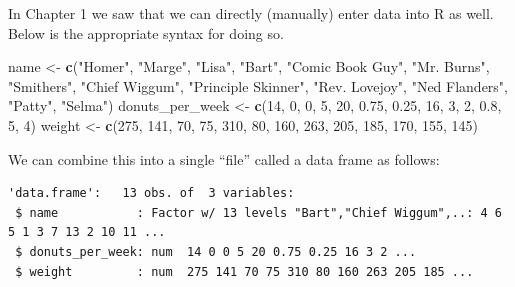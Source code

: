 \documentclass[]{book}
\newenvironment{Shaded}{\begin{snugshade}}{\end{snugshade}}
\newcommand{\DecValTok}[1]{\textcolor[rgb]{0.00,0.00,0.81}{#1}}
\newcommand{\FloatTok}[1]{\textcolor[rgb]{0.00,0.00,0.81}{#1}}
\newcommand{\KeywordTok}[1]{\textcolor[rgb]{0.13,0.29,0.53}{\textbf{#1}}}
\newcommand{\NormalTok}[1]{#1}
\newcommand{\OperatorTok}[1]{\textcolor[rgb]{0.81,0.36,0.00}{\textbf{#1}}}
\newcommand{\StringTok}[1]{\textcolor[rgb]{0.31,0.60,0.02}{#1}}
\begin{document}
In Chapter 1 we saw that we can directly (manually) enter data into R as well. Below is the appropriate syntax for doing so.

\begin{Shaded}
\begin{Highlighting}[]
\NormalTok{name <-}\StringTok{ }\KeywordTok{c}\NormalTok{(}\StringTok{"Homer"}\NormalTok{, }\StringTok{"Marge"}\NormalTok{, }\StringTok{"Lisa"}\NormalTok{, }\StringTok{"Bart"}\NormalTok{, }\StringTok{"Comic Book Guy"}\NormalTok{, }\StringTok{"Mr. Burns"}\NormalTok{, }\StringTok{"Smithers"}\NormalTok{, }\StringTok{"Chief Wiggum"}\NormalTok{, }\StringTok{"Principle Skinner"}\NormalTok{, }\StringTok{"Rev. Lovejoy"}\NormalTok{, }\StringTok{"Ned Flanders"}\NormalTok{, }\StringTok{"Patty"}\NormalTok{, }\StringTok{"Selma"}\NormalTok{)}
\NormalTok{donuts_per_week <-}\StringTok{ }\KeywordTok{c}\NormalTok{(}\DecValTok{14}\NormalTok{, }\DecValTok{0}\NormalTok{, }\DecValTok{0}\NormalTok{, }\DecValTok{5}\NormalTok{, }\DecValTok{20}\NormalTok{, }\FloatTok{0.75}\NormalTok{, }\FloatTok{0.25}\NormalTok{, }\DecValTok{16}\NormalTok{, }\DecValTok{3}\NormalTok{, }\DecValTok{2}\NormalTok{, }\FloatTok{0.8}\NormalTok{, }\DecValTok{5}\NormalTok{, }\DecValTok{4}\NormalTok{)}
\NormalTok{weight <-}\StringTok{ }\KeywordTok{c}\NormalTok{(}\DecValTok{275}\NormalTok{, }\DecValTok{141}\NormalTok{, }\DecValTok{70}\NormalTok{, }\DecValTok{75}\NormalTok{, }\DecValTok{310}\NormalTok{, }\DecValTok{80}\NormalTok{, }\DecValTok{160}\NormalTok{, }\DecValTok{263}\NormalTok{, }\DecValTok{205}\NormalTok{, }\DecValTok{185}\NormalTok{, }\DecValTok{170}\NormalTok{, }\DecValTok{155}\NormalTok{, }\DecValTok{145}\NormalTok{)}
\end{Highlighting}
\end{Shaded}

We can combine this into a single ``file'' called a data frame as follows:

\begin{Shaded}
\end{Shaded}

\begin{verbatim}
'data.frame':   13 obs. of  3 variables:
 $ name           : Factor w/ 13 levels "Bart","Chief Wiggum",..: 4 6 5 1 3 7 13 2 10 11 ...
 $ donuts_per_week: num  14 0 0 5 20 0.75 0.25 16 3 2 ...
 $ weight         : num  275 141 70 75 310 80 160 263 205 185 ...
\end{verbatim}
\end{document}
